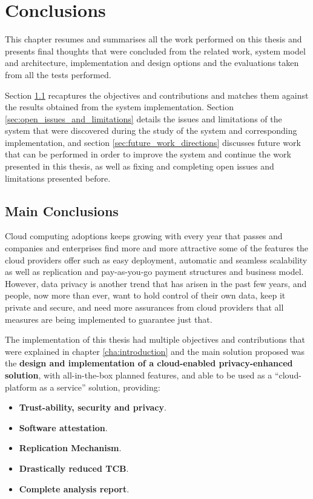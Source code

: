 
\chapter{Conclusions}
\label{cha:conclusions}

This chapter resumes and summarises all the work performed on this thesis and presents final thoughts that were concluded from the related work, system model and architecture, implementation and design options and the evaluations taken from all the tests performed.

Section \ref{sec:main_conclusion} recaptures the objectives and contributions and matches them against the results obtained from the system implementation. Section \ref{sec:open_issues_and_limitations} details the issues and limitations of the system that were discovered during the study of the system and corresponding implementation, and section \ref{sec:future_work_directions} discusses future work that can be performed in order to improve the system and continue the work presented in this thesis, as well as fixing and completing open issues and limitations presented before.

\section{Main Conclusions}
\label{sec:main_conclusion}

Cloud computing adoptions keeps growing with every year that passes and companies and enterprises find more and more attractive some of the features the cloud providers offer such as easy deployment, automatic and seamless scalability as well as replication and pay-as-you-go payment structures and business model. However, data privacy is another trend that has arisen in the past few years, and people, now more than ever, want to hold control of their own data, keep it private and secure, and need more assurances from cloud providers that all measures are being implemented to guarantee just that.

The implementation of this thesis had multiple objectives and contributions that were explained in chapter \ref{cha:introduction} and the main solution proposed was the \textbf{design and implementation of a cloud-enabled privacy-enhanced solution}, with all-in-the-box planned features, and able to be used as a “cloud-platform as a service” solution, providing:

\begin{itemize}
	\item \textbf{Trust-ability, security and privacy}.
	\item \textbf{Software attestation}.
 	\item \textbf{Replication Mechanism}.
  	\item \textbf{Drastically reduced TCB}.
  	\item \textbf{Complete analysis report}. 
\end{itemize}


